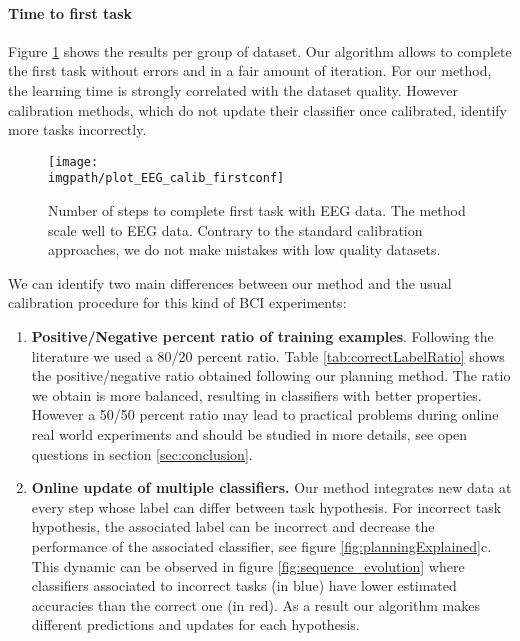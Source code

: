 \paragraph{Time to first task}

Figure \ref{fig:firstEEG} shows the results per group of dataset. Our algorithm allows to complete the first task without errors and in a fair amount of iteration.  For our method, the learning time is strongly correlated with the dataset quality. However calibration methods, which do not update their classifier once calibrated, identify more tasks incorrectly.

\begin{figure}[!h]
\centering
\texttt{[image: \\imgpath/plot\_EEG\_calib\_firstconf]}
\caption{Number of steps to complete first task with EEG data. The method scale well to EEG data. Contrary to the standard calibration approaches, we do not make mistakes with low quality datasets.}
\label{fig:firstEEG}
\end{figure} 

We can identify two main differences between our method and the usual calibration procedure for this kind of BCI experiments:
\begin{enumerate}
\item \textbf{Positive/Negative percent ratio of training examples}. Following the literature \cite{chavarriaga2010learning, iturrate2013task} we used a 80/20 percent ratio. Table \ref{tab:correctLabelRatio} shows the positive/negative ratio obtained following our planning method. The ratio we obtain is more balanced, resulting in classifiers with better properties. However a 50/50 percent ratio may lead to practical problems during online real world experiments and should be studied in more details, see open questions in section \ref{sec:conclusion}.
\item \textbf{Online update of multiple classifiers.} Our method integrates new data at every step whose label can differ between task hypothesis. For incorrect task hypothesis, the associated label can be incorrect and decrease the performance of the associated classifier, see figure \ref{fig:planningExplained}c. This dynamic can be observed in figure \ref{fig:sequence_evolution} where classifiers associated to incorrect tasks (in blue) have lower estimated accuracies than the correct one (in red). As a result our algorithm makes different predictions and updates for each hypothesis.
\end{enumerate}

